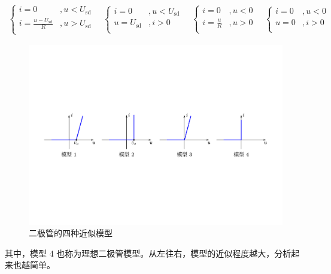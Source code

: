 \documentclass[UTF8]{report}
\theoremstyle{MyLineTheoremStyle} %
\theoremstyle{MyBlockTheoremStyle} %
\theoremstyle{MySubsubsectionStyle} %
\begin{document}
\begin{gather}
\begin{cases}
    i = 0                                &, u < U_{\text{sd}} \\ 
    i = \frac{u - U_{\text{sd}}}{R} &, u > U_{\text{sd}} \\
\end{cases}\quad 
\begin{cases}
    i = 0 &, u < U_{\text{sd}} \\ 
    u = U_{\text{sd}} &, i > 0 \\
\end{cases}\quad 
\begin{cases}
    i = 0 &, u < 0 \\ 
    i = \frac{u}{R} &, u > 0 \\
\end{cases}\quad 
\begin{cases}
    i = 0 &, u < 0 \\ 
    u = 0 &, i > 0 \\
\end{cases}
\end{gather}
\begin{figure}[H]\centering
\includegraphics[width=\columnwidth]{assets/4/二极管的四种近似模型.pdf}
\caption{二极管的四种近似模型}\label{二极管的四种近似模型}
\end{figure}
其中，模型 4 也称为理想二极管模型。从左往右，模型的近似程度越大，分析起来也越简单。
\end{document}
